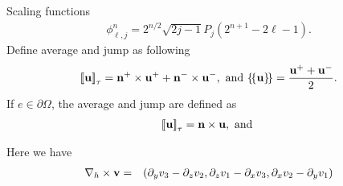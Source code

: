 \documentclass[final,leqno]{siamltex704}
\newcommand{\bn}{{\bf n}}
\newcommand{\bv}{{\bf v}}
\def\bn{{\bf n}}
\def\bu{{\bf u}}
\def\bv{{\bf v}}
\def\bE{{\bf E}}
\def\bB{{\bf B}}
\def\ljump{{[\![}}
\def\rjump{{]\!]}}
\def\lavg{{\{\!\{}}
\def\ravg{{\}\!\}}}
\begin{document}
%


Scaling functions
\begin{eqnarray*}
\phi_{\ell,j}^n = 2^{n/2}\sqrt{2j-1}P_j(2^{n+1}-2\ell-1).
\end{eqnarray*}
Define average and jump as following
\begin{eqnarray*}
\ljump \bu \rjump_{\tau}={\bf n}^+\times\bu^++{\bf n}^-\times\bu^-,\mbox{ and }\lavg \bu\ravg=\frac{\bu^++\bu^-}{2}.
\end{eqnarray*}
If $e\in\partial\Omega$, the average and jump are defined as
\begin{eqnarray*}
\ljump \bu \rjump_{\tau}={\bf n}\times\bu,\mbox{ and }
\end{eqnarray*}

Here we have
\begin{eqnarray*}
\nabla_h\times\bv&=&(\partial_y v_3-\partial_zv_2,\partial_zv_1-\partial_xv_3,\partial_xv_2-\partial_yv_1)
\end{eqnarray*}
\end{document}
